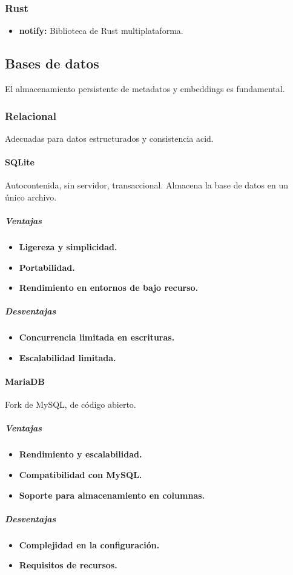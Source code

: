 \subsubsection{Rust}
\begin{itemize}
    \item \textbf{notify:} Biblioteca de Rust multiplataforma.
\end{itemize}

\subsection{Bases de datos}
El almacenamiento persistente de metadatos y embeddings es fundamental.

\subsubsection{Relacional}
Adecuadas para datos estructurados y consistencia \gls{acid}.

\paragraph{SQLite}
Autocontenida, sin servidor, transaccional. Almacena la base de datos en un único archivo.
\subparagraph{Ventajas}
\begin{itemize}
    \item \textbf{Ligereza y simplicidad.}
    \item \textbf{Portabilidad.}
    \item \textbf{Rendimiento en entornos de bajo recurso.}
\end{itemize}
\subparagraph{Desventajas}
\begin{itemize}
    \item \textbf{Concurrencia limitada en escrituras.}
    \item \textbf{Escalabilidad limitada.}
\end{itemize}

\paragraph{MariaDB}
Fork de MySQL, de código abierto.
\subparagraph{Ventajas}
\begin{itemize}
    \item \textbf{Rendimiento y escalabilidad.}
    \item \textbf{Compatibilidad con MySQL.}
    \item \textbf{Soporte para almacenamiento en columnas.}
\end{itemize}
\subparagraph{Desventajas}
\begin{itemize}
    \item \textbf{Complejidad en la configuración.}
    \item \textbf{Requisitos de recursos.}
\end{itemize}

